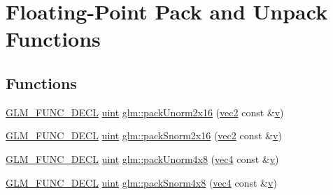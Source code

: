 \hypertarget{group__core__func__packing}{}\section{Floating-\/\+Point Pack and Unpack Functions}
\label{group__core__func__packing}
\subsection*{Functions}
\begin{DoxyCompactItemize}
\item 
\mbox{\hyperlink{setup_8hpp_ab2d052de21a70539923e9bcbf6e83a51}{G\+L\+M\+\_\+\+F\+U\+N\+C\+\_\+\+D\+E\+CL}} \mbox{\hyperlink{group__core__precision_ga4fd29415871152bfb5abd588334147c8}{uint}} \mbox{\hyperlink{group__core__func__packing_ga0659ddaf09727551c7bf51655d2a65cf}{glm\+::pack\+Unorm2x16}} (\mbox{\hyperlink{group__core__types_gaa1618f51db67eaa145db101d8c8431d8}{vec2}} const \&\mbox{\hyperlink{glad_8h_a14cfbe2fc2234f5504618905b69d1e06}{v}})
\item 
\mbox{\hyperlink{setup_8hpp_ab2d052de21a70539923e9bcbf6e83a51}{G\+L\+M\+\_\+\+F\+U\+N\+C\+\_\+\+D\+E\+CL}} \mbox{\hyperlink{group__core__precision_ga4fd29415871152bfb5abd588334147c8}{uint}} \mbox{\hyperlink{group__core__func__packing_ga0c8005de240d6c4ca3d16c7bee25c622}{glm\+::pack\+Snorm2x16}} (\mbox{\hyperlink{group__core__types_gaa1618f51db67eaa145db101d8c8431d8}{vec2}} const \&\mbox{\hyperlink{glad_8h_a14cfbe2fc2234f5504618905b69d1e06}{v}})
\item 
\mbox{\hyperlink{setup_8hpp_ab2d052de21a70539923e9bcbf6e83a51}{G\+L\+M\+\_\+\+F\+U\+N\+C\+\_\+\+D\+E\+CL}} \mbox{\hyperlink{group__core__precision_ga4fd29415871152bfb5abd588334147c8}{uint}} \mbox{\hyperlink{group__core__func__packing_ga834ee9a9e73dcb0a7c1fc88143f3edb8}{glm\+::pack\+Unorm4x8}} (\mbox{\hyperlink{group__core__types_ga5881b1b022d7fd1b7218f5916532dd02}{vec4}} const \&\mbox{\hyperlink{glad_8h_a14cfbe2fc2234f5504618905b69d1e06}{v}})
\item 
\mbox{\hyperlink{setup_8hpp_ab2d052de21a70539923e9bcbf6e83a51}{G\+L\+M\+\_\+\+F\+U\+N\+C\+\_\+\+D\+E\+CL}} \mbox{\hyperlink{group__core__precision_ga4fd29415871152bfb5abd588334147c8}{uint}} \mbox{\hyperlink{group__core__func__packing_gafcf25acc0d361c6c696a433aa5dfd16b}{glm\+::pack\+Snorm4x8}} (\mbox{\hyperlink{group__core__types_ga5881b1b022d7fd1b7218f5916532dd02}{vec4}} const \&\mbox{\hyperlink{glad_8h_a14cfbe2fc2234f5504618905b69d1e06}{v}})

\end{DoxyCompactItemize}
